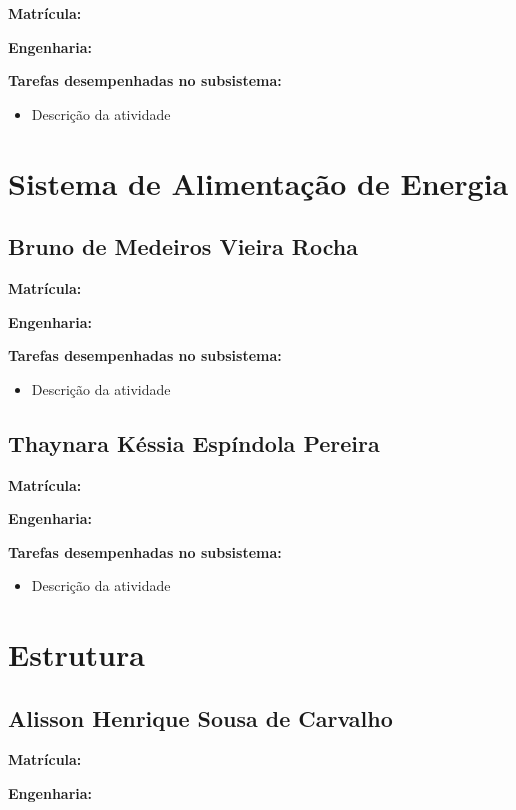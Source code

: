 \textbf{Matrícula:}

\textbf{Engenharia:}

\textbf{Tarefas desempenhadas no subsistema:}

\begin{itemize}
\item Descrição da atividade
\end{itemize}


\section{Sistema de Alimentação de Energia}

\subsection{Bruno de Medeiros Vieira Rocha}

\textbf{Matrícula:}

\textbf{Engenharia:}

\textbf{Tarefas desempenhadas no subsistema:}

\begin{itemize}
\item Descrição da atividade
\end{itemize}


\subsection{Thaynara Késsia Espíndola Pereira}

\textbf{Matrícula:}

\textbf{Engenharia:}

\textbf{Tarefas desempenhadas no subsistema:}

\begin{itemize}
\item Descrição da atividade
\end{itemize}


\section{Estrutura}


\subsection{Alisson Henrique Sousa de Carvalho}

\textbf{Matrícula:}

\textbf{Engenharia:}

